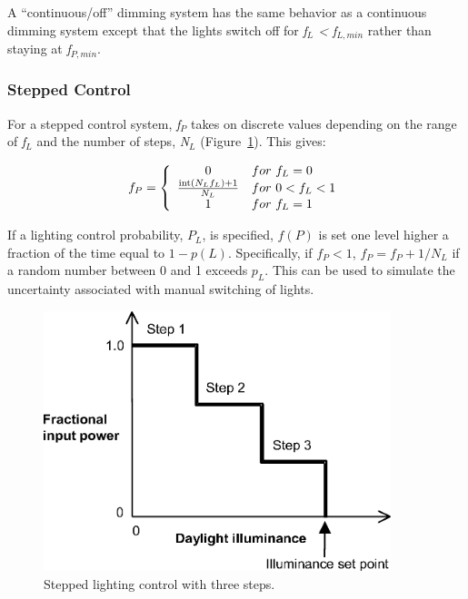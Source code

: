 A ``continuous/off'' dimming system has the same behavior as a continuous dimming system except that the lights switch off for \emph{f\(_{L}\) \textless{} f\(_{L,min}\)} rather than staying at \emph{f\(_{P,min}\)}.

\subsubsection{Stepped Control}\label{stepped-control}

For a stepped control system, \emph{f\(_{P}\)} takes on discrete values depending on the range of \emph{f\(_{L}\)} and the number of steps, \emph{N\(_{L}\)} (Figure~\ref{fig:stepped-lighting-control-with-three-steps.}). This gives:

\begin{equation}
  f_P = \left\{
          \begin{array}{cl}
            0 & for~f_L = 0 \\
            \frac{\mathop{\rm int} (N_L f_L) + 1}{N_L} & for~0 < f_L < 1 \\
            1 & for~f_L = 1
          \end{array}
         \right.
\end{equation}

If a lighting control probability, $P_L$, is specified, $f(P)$ is set one level higher a fraction of the time equal to $1-p(L)$. Specifically, if $f_P<1$, $f_P = f_P+1/N_L$ if a random number between 0 and 1 exceeds $p_L$. This can be used to simulate the uncertainty associated with manual switching of lights.

\begin{figure}[hbtp] %
\centering
\includegraphics[width=0.9\textwidth, height=0.9\textheight, keepaspectratio=true]{media/image825.png}
\caption{Stepped lighting control with three steps. \protect \label{fig:stepped-lighting-control-with-three-steps.}}
\end{figure}

